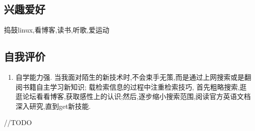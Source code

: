 \documentclass[UTF8]{ctexart}
\begin{document}
\subsection{兴趣爱好}
\label{sec-1-6}
捣鼓linux,看博客,读书,听歌,爱运动
\subsection{自我评价}
\label{sec-1-7}
\begin{enumerate}
\item 自学能力强. 当我面对陌生的新技术时,不会束手无策,而是通过上网搜索或是翻阅书籍自主学习新知识;
载检索信息的过程中注重检索技巧, 首先粗略搜索,逛逛论坛看看博客,获取感性上的认识;然后,逐步缩小搜索范围,阅读官方英语文档深入研究,直到get新技能.
\end{enumerate}
//TODO
\end{document}
